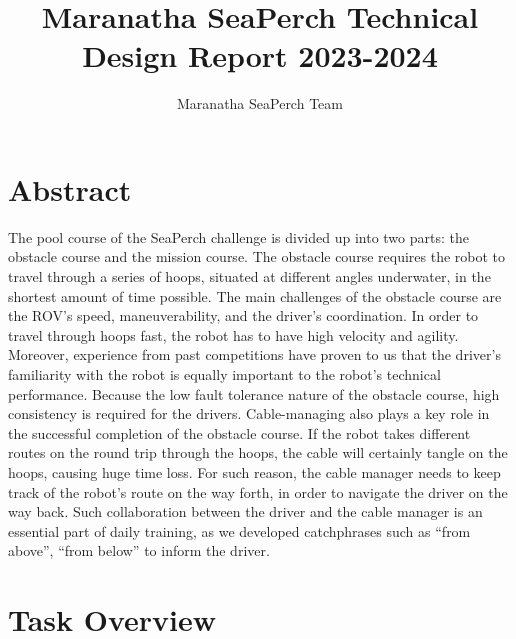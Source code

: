 \documentclass[11pt, oneside]{article}   	%
\title{Maranatha SeaPerch Technical Design Report 2023-2024}
\author{Maranatha SeaPerch Team}
\begin{document}
\maketitle

\pagebreak

\section{Abstract}
The pool course of the SeaPerch challenge is divided up into two parts: the obstacle course and the mission course. The obstacle course requires the robot to travel through a series of hoops, situated at different angles underwater, in the shortest amount of time possible. The main challenges of the obstacle course are the ROV’s speed, maneuverability, and the driver’s coordination. In order to travel through hoops fast, the robot has to have high velocity and agility. Moreover, experience from past competitions have proven to us that the driver’s familiarity with the robot is equally important to the robot’s technical performance. Because the low fault tolerance nature of the obstacle course, high consistency is required for the drivers. Cable-managing also plays a key role in the successful completion of the obstacle course. If the robot takes different routes on the round trip through the hoops, the cable will certainly tangle on the hoops, causing huge time loss. For such reason, the cable manager needs to keep track of the robot’s route on the way forth, in order to navigate the driver on the way back. Such collaboration between the driver and the cable manager is an essential part of daily training, as we developed catchphrases such as “from above”, “from below” to inform the driver.

\section{Task Overview}
\end{document}
